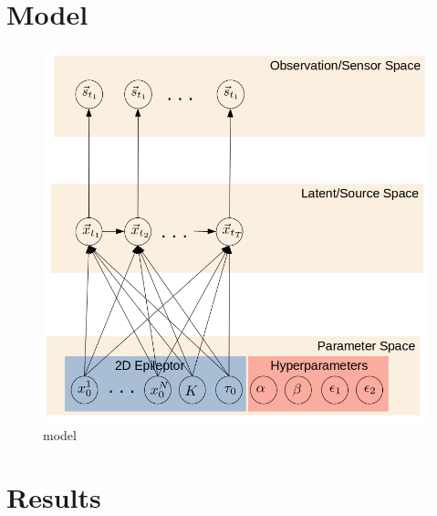 \documentclass[12pt]{article}
\begin{document}
\section*{Model}
\begin{figure}[h!]
  \centering
  \includegraphics[width=\textwidth]{figures/vep_model.png}
  \caption{model}
  \label{fig:vep_model}
\end{figure}
\section*{Results}
\end{document}
